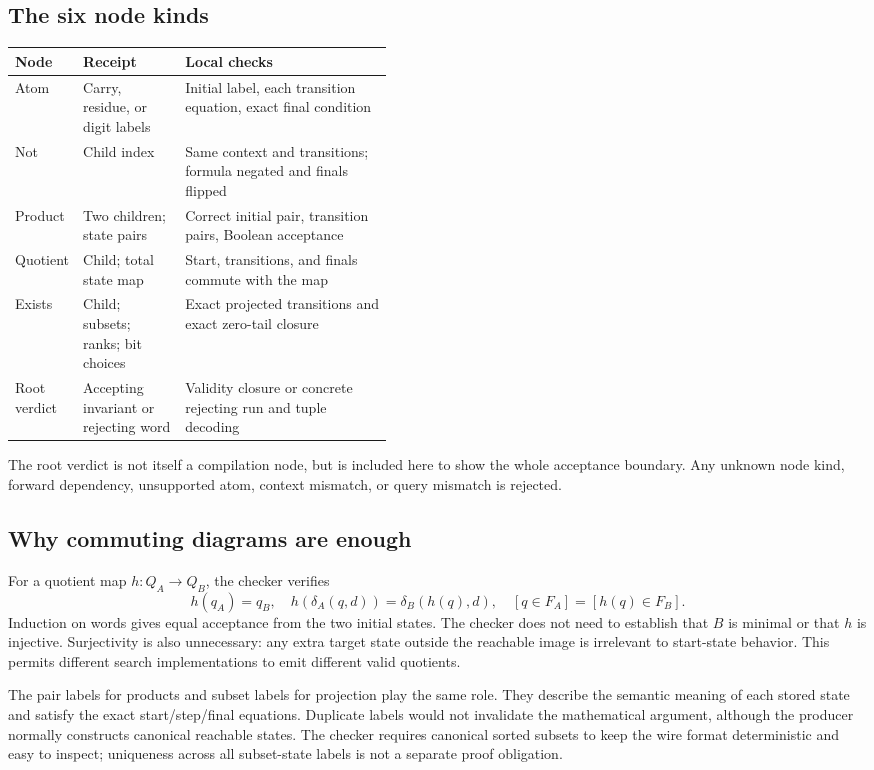 \subsection{The six node kinds}
\begin{center}
\begin{tabularx}{\linewidth}{@{}p{0.17\linewidth}p{0.27\linewidth}X@{}}
\toprule
Node & Receipt & Local checks\\
\midrule
Atom & Carry, residue, or digit labels & Initial label, each transition equation, exact final condition\\
Not & Child index & Same context and transitions; formula negated and finals flipped\\
Product & Two children; state pairs & Correct initial pair, transition pairs, Boolean acceptance\\
Quotient & Child; total state map & Start, transitions, and finals commute with the map\\
Exists & Child; subsets; ranks; bit choices & Exact projected transitions and exact zero-tail closure\\
Root verdict & Accepting invariant or rejecting word & Validity closure or concrete rejecting run and tuple decoding\\
\bottomrule
\end{tabularx}
\end{center}
The root verdict is not itself a compilation node, but is included here to show the whole acceptance boundary. Any unknown node kind, forward dependency, unsupported atom, context mismatch, or query mismatch is rejected.

\subsection{Why commuting diagrams are enough}
For a quotient map \(h:Q_A\to Q_B\), the checker verifies
\[
 h(q_A)=q_B,\quad
 h(\delta_A(q,d))=\delta_B(h(q),d),\quad
 [q\in F_A]=[h(q)\in F_B].
\]
Induction on words gives equal acceptance from the two initial states. The checker does not need to establish that \(B\) is minimal or that \(h\) is injective. Surjectivity is also unnecessary: any extra target state outside the reachable image is irrelevant to start-state behavior. This permits different search implementations to emit different valid quotients.

The pair labels for products and subset labels for projection play the same role. They describe the semantic meaning of each stored state and satisfy the exact start/step/final equations. Duplicate labels would not invalidate the mathematical argument, although the producer normally constructs canonical reachable states. The checker requires canonical sorted subsets to keep the wire format deterministic and easy to inspect; uniqueness across all subset-state labels is not a separate proof obligation.


